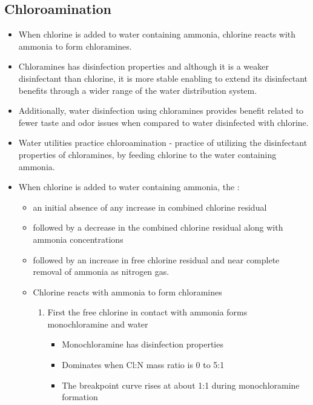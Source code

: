 \subsection{Chloroamination}
			\begin{itemize}
			\item When chlorine is added to water containing ammonia, chlorine reacts with ammonia to form chloramines.
						\item Chloramines has disinfection properties and although it is a weaker disinfectant than chlorine, it is more stable enabling to extend its disinfectant benefits through a wider range of the water distribution system.
						\item Additionally, water disinfection using chloramines provides benefit related to fewer taste and odor issues when compared to water disinfected with chlorine. 
					\item Water utilities practice chloroamination - practice of utilizing the disinfectant properties of chloramines, by feeding chlorine to the water containing ammonia.
			\item When chlorine is added to water containing ammonia, the :
			\begin{itemize}
				\item an initial absence of any increase in combined chlorine residual
				\item followed by a decrease in the combined chlorine residual
				along with ammonia concentrations
				\item followed by an increase in free chlorine residual and near complete removal 					of ammonia as nitrogen gas.\\
				\item Chlorine reacts with ammonia to form chloramines\\
				\begin{enumerate}
					\item First the free chlorine in contact with ammonia forms monochloramine and water
						\begin{itemize}
							\item Monochloramine has disinfection properties\\
							\item Dominates when Cl:N mass ratio is 0 to 5:1\\
							\item The breakpoint curve rises at about 1:1 during monochloramine formation\\
						\end{itemize}

\end{enumerate}
\end{itemize}
\end{itemize}
